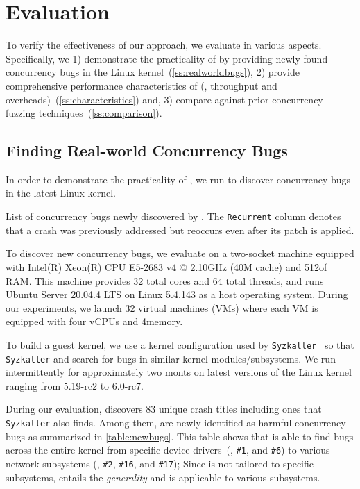 \section{Evaluation}
\label{s:eval}

To verify the effectiveness of our approach, we evaluate \sys in
various aspects.
%
Specifically, we 1) demonstrate the practicality of \sys by providing
newly found concurrency bugs in the Linux
kernel~(\autoref{ss:realworldbugs}),
%
2) provide comprehensive performance characteristics of \sys (\eg,
throughput and overheads)~(\autoref{ss:characteristics}) and,
%
3) compare \sys against prior concurrency fuzzing
techniques~(\autoref{ss:comparison}).

\subsection{Finding Real-world Concurrency Bugs}
\label{ss:realworldbugs}

In order to demonstrate the practicality of \sys, we run \sys to
discover concurrency bugs in the latest Linux kernel.

\begin{table}[t]
  
  \centering
  \caption{List of concurrency bugs newly discovered by \sys. The
    \texttt{Recurrent} column denotes that a crash was previously
    addressed but reoccurs even after its patch is applied.}
  \label{table:newbugs}
\end{table}

%
To discover new concurrency bugs, we evaluate \sys on a two-socket
machine equipped with Intel(R) Xeon(R) CPU E5-2683 v4 @ 2.10GHz (40M
cache) and 512\GB of RAM.
%
This machine provides 32 total cores and 64 total threads, and runs
Ubuntu Server 20.04.4 LTS on Linux 5.4.143 as a host operating system.
%
During our experiments, we launch 32 virtual machines (VMs) where each
VM is equipped with four vCPUs and 4\GB memory.

To build a guest kernel, we use a kernel configuration used by
\texttt{Syzkaller}~\cite{syzkaller} so that \texttt{Syzkaller} and
\sys search for bugs in similar kernel modules/subsystems.
%
We run intermittently \sys for approximately two monts on latest
versions of the Linux kernel ranging from 5.19-rc2 to 6.0-rc7.


%
During our evaluation, \sys discovers 83 unique crash titles including
ones that \texttt{Syzkaller} also finds. Among them, \totalbugs are
newly identified as harmful concurrency bugs as summarized in
\autoref{table:newbugs}.
%
This table shows that \sys is able to find bugs across the entire
kernel from specific device drivers~(\eg, \texttt{\#1}, and
\texttt{\#6}) to various network subsystems (\eg, \texttt{\#2},
\texttt{\#16}, and \texttt{\#17}); Since \sys is not tailored to
specific subsystems, \sys entails the \textit{generality} and is
applicable to various subsystems.

